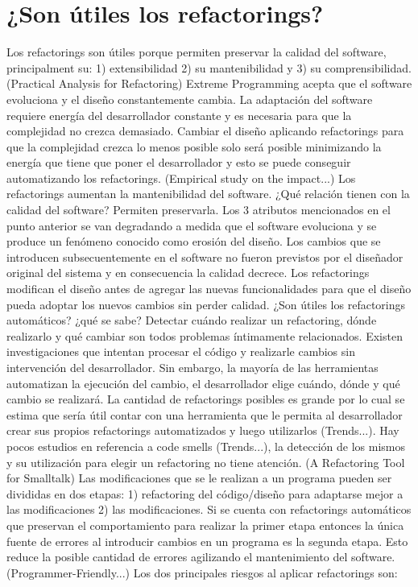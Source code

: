 \section{¿Son útiles los refactorings?}
Los refactorings son útiles porque permiten preservar la calidad del software, principalment su: 1)
extensibilidad 2) su mantenibilidad y 3) su comprensibilidad.
(Practical Analysis for Refactoring)
Extreme Programming acepta que el software evoluciona y el diseño constantemente cambia. La
adaptación del software requiere energía del desarrollador constante y es necesaria para que la
complejidad no crezca demasiado. Cambiar el diseño aplicando refactorings para que la complejidad
crezca lo menos posible solo será posible minimizando la energía que tiene que poner el
desarrollador y esto se puede conseguir automatizando los refactorings.
(Empirical study on the impact...)
Los refactorings aumentan la mantenibilidad del software. ¿Qué relación tienen con la
calidad del software? Permiten preservarla. Los 3 atributos mencionados en el punto anterior se van
degradando a medida que el software evoluciona y se produce un fenómeno conocido como erosión del
diseño. Los cambios que se introducen subsecuentemente en el software no fueron previstos por el
diseñador original del sistema y en consecuencia la calidad decrece. Los refactorings modifican el
diseño antes de agregar las nuevas funcionalidades para que el diseño pueda adoptar los nuevos
cambios sin perder calidad. ¿Son útiles los refactorings automáticos? ¿qué se sabe? Detectar cuándo
realizar un refactoring, dónde realizarlo y qué cambiar son todos problemas íntimamente
relacionados. Existen investigaciones que intentan procesar el código y realizarle cambios sin
intervención del desarrollador. Sin embargo, la mayoría de las herramientas automatizan la ejecución
del cambio, el desarrollador elige cuándo, dónde y qué cambio se realizará. La cantidad de
refactorings posibles es grande por lo cual se estima que sería útil contar con una herramienta que
le permita al desarrollador crear sus propios refactorings automatizados y luego utilizarlos
(Trends...). Hay pocos estudios en referencia a code smells (Trends...), la detección de los mismos
y su utilización para elegir un refactoring no tiene atención.
(A Refactoring Tool for Smalltalk)
Las modificaciones que se le realizan a un programa pueden ser divididas en dos etapas:
1) refactoring del código/diseño para adaptarse mejor a las modificaciones
2) las modificaciones. Si se cuenta con refactorings automáticos que preservan el comportamiento
para realizar la primer etapa entonces la única fuente de errores al introducir cambios en un
programa es la segunda etapa. Esto reduce la posible cantidad de errores agilizando el mantenimiento
del software.
(Programmer-Friendly...) Los dos principales riesgos al aplicar refactorings son:

